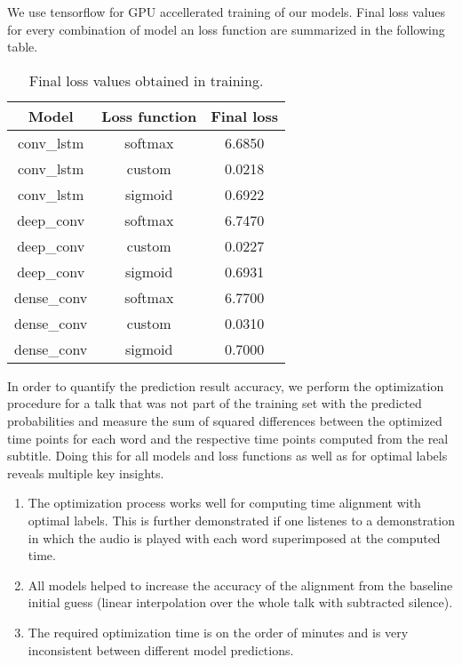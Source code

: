 We use tensorflow for GPU accellerated training of our models. Final loss values for every combination of model an loss function are summarized in the following table.
\FloatBarrier
\begin{table}[ht]
	\label{tab:training_results}
	\centering
	\begin{tabular}{ccc}
		\toprule
		Model & Loss function & Final loss\\
		\midrule
		conv\_lstm  & softmax & 6.6850 \\
		conv\_lstm  & custom  & 0.0218 \\
		conv\_lstm  & sigmoid & 0.6922 \\
		deep\_conv  & softmax & 6.7470 \\
		deep\_conv  & custom  & 0.0227 \\
		deep\_conv  & sigmoid & 0.6931 \\
		dense\_conv & softmax & 6.7700 \\
		dense\_conv & custom  & 0.0310 \\
		dense\_conv & sigmoid & 0.7000 \\
		\bottomrule
	\end{tabular}
	\caption{Final loss values obtained in training.}
\end{table}
\FloatBarrier

In order to quantify the prediction result accuracy, we perform the optimization procedure for a talk that was not part of the training set with the predicted probabilities and measure the sum of squared differences between the optimized time points for each word and the respective time points computed from the real subtitle. Doing this for all models and loss functions as well as for optimal labels reveals multiple key insights.

\begin{enumerate}
	\item The optimization process works well for computing time alignment with optimal labels. This is further demonstrated if one listenes to a demonstration in which the audio is played with each word superimposed at the computed time.
	\item All models helped to increase the accuracy of the alignment from the baseline initial guess (linear interpolation over the whole talk with subtracted silence).
	\item The required optimization time is on the order of minutes and is very inconsistent between different model predictions.
\end{enumerate}

